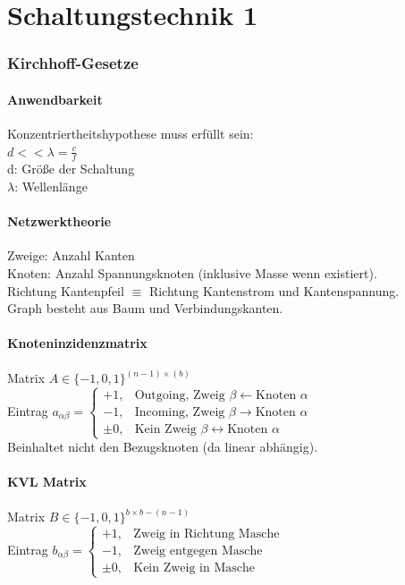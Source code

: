 \documentclass[a4paper,twocolumn,10pt]{article}
\begin{document}
\part*{Schaltungstechnik 1}

\section*{Kirchhoff-Gesetze}
\subsection*{Anwendbarkeit}
Konzentriertheitshypothese muss erfüllt sein:\\
$d<<\lambda = \frac{c}{f}$\\
d: Größe der Schaltung\\
$\lambda$: Wellenlänge

\subsection*{Netzwerktheorie}
Zweige: Anzahl Kanten\\
Knoten: Anzahl Spannungsknoten (inklusive Masse wenn existiert).\\
Richtung Kantenpfeil $\equiv$ Richtung Kantenstrom und Kantenspannung.\\
Graph besteht aus Baum und Verbindungskanten.

\subsection*{Knoteninzidenzmatrix}
Matrix $A\in \{-1, 0, 1\}^{(n-1)\times(b)}$\\
Eintrag $a_{\alpha\beta}=\begin{cases}+1,&\text{Outgoing, Zweig }\beta\leftarrow\text{Knoten }\alpha\\-1,&\text{Incoming, Zweig }\beta\rightarrow\text{Knoten }\alpha\\\pm0,&\text{Kein Zweig }\beta\leftrightarrow\text{Knoten }\alpha\end{cases}$\\
Beinhaltet nicht den Bezugsknoten (da linear abhängig).

\subsection{KVL Matrix}
Matrix $B\in \{-1, 0, 1\}^{b\times b-(n-1)}$\\
Eintrag $b_{\alpha\beta}=\begin{cases}+1,&\text{Zweig in Richtung Masche}\\-1,&\text{Zweig entgegen Masche}\\\pm0,&\text{Kein Zweig in Masche}\end{cases}$\\
\end{document}
